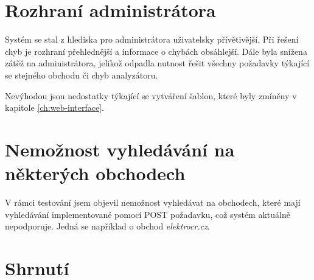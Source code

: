 \documentclass[thesis=B,czech]{FITthesis}[2012/06/26]
\begin{document}
\section{Rozhraní administrátora}
Systém se stal z hlediska pro administrátora uživatelsky přívětivější. Při řešení chyb je rozhraní přehlednější a informace o chybách
obsáhlejší. Dále byla snížena zátěž na administrátora, jelikož odpadla nutnost řešit
všechny požadavky týkající se stejného obchodu či chyb analyzátoru.
\par 
Nevýhodou jsou nedostatky týkající se vytváření šablon, které byly zmíněny v kapitole \ref{ch:web-interface}.

\section{Nemožnost vyhledávání na některých obchodech}
V rámci testování jsem objevil nemožnost vyhledávat na obchodech, které mají vyhledávání implementované pomocí POST požadavku, což
systém aktuálně nepodporuje. Jedná se například o obchod \textit{elektrocr.cz}.

\section{Shrnutí}
\end{document}
